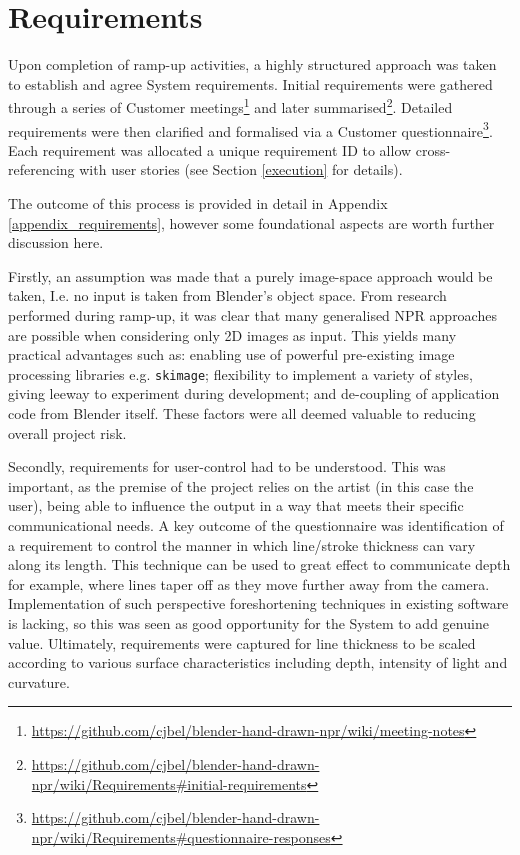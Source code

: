 \section{Requirements}

Upon completion of ramp-up activities, a highly structured approach was taken to establish and agree System requirements.
Initial requirements were gathered through a series of Customer meetings\footnote{\url{https://github.com/cjbel/blender-hand-drawn-npr/wiki/meeting-notes}} and later summarised\footnote{\url{https://github.com/cjbel/blender-hand-drawn-npr/wiki/Requirements#initial-requirements}}.
Detailed requirements were then clarified and formalised via a Customer questionnaire\footnote{\url{https://github.com/cjbel/blender-hand-drawn-npr/wiki/Requirements#questionnaire-responses}}. Each requirement was allocated a unique requirement ID to allow cross-referencing with user stories (see Section \ref{execution} for details).

The outcome of this process is provided in detail in Appendix \ref{appendix_requirements}, however some foundational aspects are worth further discussion here.

Firstly, an assumption was made that a purely image-space approach would be taken, I.e. no input is taken from Blender's object space.
From research performed during ramp-up, it was clear that many generalised NPR approaches are possible when considering only 2D images as input.
This yields many practical advantages such as: enabling use of powerful pre-existing image processing libraries e.g. \texttt{skimage}; flexibility to implement a variety of styles, giving leeway to experiment during development; and de-coupling of application code from Blender itself.
These factors were all deemed valuable to reducing overall project risk.

Secondly, requirements for user-control had to be understood.
This was important, as the premise of the project relies on the artist (in this case the user), being able to influence the output in a way that meets their specific communicational needs.
A key outcome of the questionnaire was identification of a requirement to control the manner in which line/stroke thickness can vary along its length.
This technique can be used to great effect to communicate depth for example, where lines taper off as they move further away from the camera.
Implementation of such perspective foreshortening techniques in existing software is lacking, so this was seen as good opportunity for the System to add genuine value.
Ultimately, requirements were captured for line thickness to be scaled according to various surface characteristics including depth, intensity of light and curvature.

